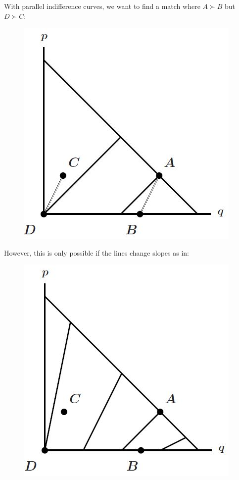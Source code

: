 \documentclass[12pt]{report}
\begin{document}
With parallel indifference curves, we want to find a match where $A\succ B$ but $D\succ C$:
\begin{figure}[ht!]
\centering
\includegraphics[scale=0.43]{images/machinaallais2}
\end{figure}

However, this is only possible if the lines change slopes as in:
\begin{figure}[ht!]
\centering
\includegraphics[scale=0.43]{images/machinaallais3}
\end{figure}
\end{document}

